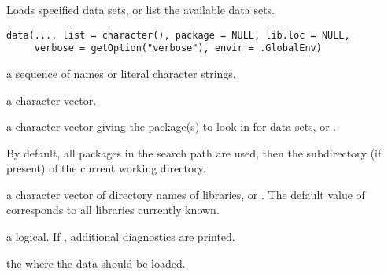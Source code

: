 %
\begin{Description}\relax
Loads specified data sets, or list the available data sets.
\end{Description}
%
\begin{Usage}
\begin{verbatim}
data(..., list = character(), package = NULL, lib.loc = NULL,
     verbose = getOption("verbose"), envir = .GlobalEnv)
\end{verbatim}
\end{Usage}
%
\begin{Arguments}
\begin{ldescription}
\item[\code{...}] a sequence of names or literal character strings.
\item[\code{list}] a character vector.
\item[\code{package}] 
a character vector giving the package(s) to look
in for data sets, or .

By default, all packages in the search path are used, then
the  subdirectory (if present) of the current working
directory.

\item[\code{lib.loc}] a character vector of directory names of \R{} libraries,
or .  The default value of  corresponds to all
libraries currently known.
\item[\code{verbose}] a logical.  If , additional diagnostics are
printed.
\item[\code{envir}] the  where the data should be loaded.
\end{ldescription}
\end{Arguments}
%
